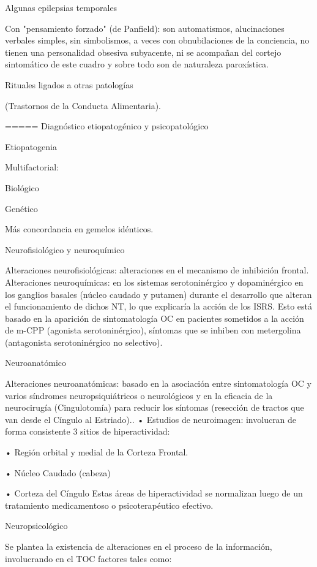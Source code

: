 \documentclass[encares.tex]{subfiles}
\begin{document}
Algunas epilepsias temporales

Con "pensamiento forzado" (de Panfield): son automatismos, alucinaciones verbales simples, sin simbolismos, a veces con obnubilaciones de la conciencia, no tienen una personalidad obsesiva subyacente, ni se acompañan del cortejo sintomático de este cuadro y sobre todo son de naturaleza paroxística.

Rituales ligados a otras patologías

(Trastornos de la Conducta Alimentaria).

===== Diagnóstico etiopatogénico y psicopatológico

Etiopatogenia

Multifactorial:

Biológico

Genético

Más concordancia en gemelos idénticos.

Neurofisiológico y neuroquímico

Alteraciones neurofisiológicas: alteraciones en el mecanismo de inhibición frontal. Alteraciones neuroquímicas: en los sistemas serotoninérgico y dopaminérgico en los ganglios basales (núcleo caudado y putamen) durante el desarrollo que alteran el funcionamiento de dichos NT, lo que explicaría la acción de los ISRS. Esto está basado en la aparición de sintomatología OC en pacientes sometidos a la acción de m-CPP (agonista serotoninérgico), síntomas que se inhiben con metergolina (antagonista serotoninérgico no selectivo).

Neuroanatómico

Alteraciones neuroanatómicas: basado en la asociación entre sintomatología OC y varios síndromes neuropsiquiátricos o neurológicos y en la eficacia de la neurocirugía (Cingulotomía) para reducir los síntomas (resección de tractos que van desde el Cíngulo al Estriado).. • Estudios de neuroimagen: involucran de forma consistente 3 sitios de hiperactividad:

• Región orbital y medial de la Corteza Frontal.

• Núcleo Caudado (cabeza)

• Corteza del Cíngulo Estas áreas de hiperactividad se normalizan luego de un tratamiento medicamentoso o psicoterapéutico efectivo.

Neuropsicológico

Se plantea la existencia de alteraciones en el proceso de la información, involucrando en el TOC factores tales como:
\end{document}
